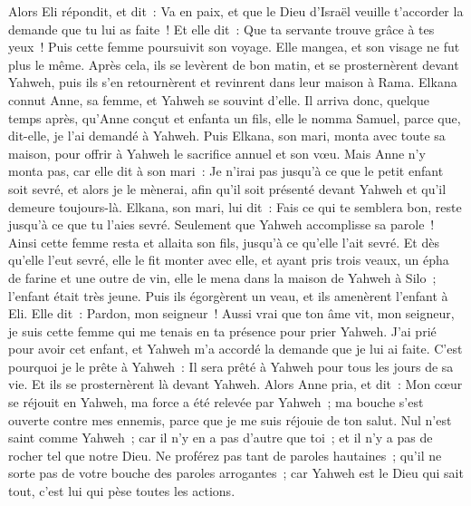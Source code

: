 \begin{multicols}{2}
Alors Eli répondit, et dit~: Va en paix, et que le Dieu d'Israël veuille t'accorder la demande que tu lui as faite~!
Et elle dit~: Que ta servante trouve grâce à tes yeux~! Puis cette femme poursuivit son voyage. Elle mangea, et son visage ne fut plus le même.
Après cela, ils se levèrent de bon matin, et se prosternèrent devant Yahweh, puis ils s'en retournèrent et revinrent dans leur maison à Rama. Elkana connut Anne, sa femme, et Yahweh se souvint d'elle.
Il arriva donc, quelque temps après, qu'Anne conçut et enfanta un fils, elle le nomma Samuel, parce que, dit-elle, je l'ai demandé à Yahweh.
Puis Elkana, son mari, monta avec toute sa maison, pour offrir à Yahweh le sacrifice annuel et son vœu.
Mais Anne n'y monta pas, car elle dit à son mari~: Je n'irai pas jusqu'à ce que le petit enfant soit sevré, et alors je le mènerai, afin qu'il soit présenté devant Yahweh et qu'il demeure toujours-là.
Elkana, son mari, lui dit~: Fais ce qui te semblera bon, reste jusqu'à ce que tu l'aies sevré. Seulement que Yahweh accomplisse sa parole~! Ainsi cette femme resta et allaita son fils, jusqu'à ce qu'elle l'ait sevré.
Et dès qu'elle l'eut sevré, elle le fit monter avec elle, et ayant pris trois veaux, un épha de farine et une outre de vin, elle le mena dans la maison de Yahweh à Silo~; l'enfant était très jeune.
Puis ils égorgèrent un veau, et ils amenèrent l'enfant à Eli.
Elle dit~: Pardon, mon seigneur~! Aussi vrai que ton âme vit, mon seigneur, je suis cette femme qui me tenais en ta présence pour prier Yahweh.
J'ai prié pour avoir cet enfant, et Yahweh m'a accordé la demande que je lui ai faite.
C'est pourquoi je le prête à Yahweh~: Il sera prêté à Yahweh pour tous les jours de sa vie. Et ils se prosternèrent là devant Yahweh.
\VerseOne{}Alors Anne pria, et dit~: Mon cœur se réjouit en Yahweh, ma force a été relevée par Yahweh~; ma bouche s'est ouverte contre mes ennemis, parce que je me suis réjouie de ton salut.
Nul n'est saint comme Yahweh~; car il n'y en a pas d'autre que toi~; et il n'y a pas de rocher tel que notre Dieu.
Ne proférez pas tant de paroles hautaines~; qu'il ne sorte pas de votre bouche des paroles arrogantes~; car Yahweh est le Dieu qui sait tout, c'est lui qui pèse toutes les actions.

\end{multicols}
